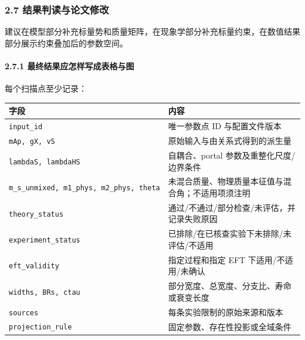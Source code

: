 \documentclass[
  chinese,
  UTF8]{ctexart}
\newcounter{none} %
\begin{document}
\subsubsection{2.7 结果判读与论文修改}\label{major-1-step-7}

建议在模型部分补充标量势和质量矩阵，在现象学部分补充标量约束，在数值结果部分展示约束叠加后的参数空间。

\paragraph{2.7.1
最终结果应怎样写成表格与图}\label{ux6700ux7ec8ux7ed3ux679cux5e94ux600eux6837ux5199ux6210ux8868ux683cux4e0eux56fe}

每个扫描点至少记录：

{\def\LTcaptype{none} %
\begin{longtable}[]{@{}
  >{\raggedright\arraybackslash}p{}
  >{\raggedright\arraybackslash}p{}@{}}
\toprule\noalign{}
\begin{minipage}[b]{\linewidth}\raggedright
字段
\end{minipage} & \begin{minipage}[b]{\linewidth}\raggedright
内容
\end{minipage} \\
\midrule\noalign{}
\endhead
\bottomrule\noalign{}
\endlastfoot
\texttt{input\_id} & 唯一参数点 ID 与配置文件版本 \\
\texttt{mAp,\ gX,\ vS} & 原始输入与由关系式得到的派生量 \\
\texttt{lambdaS,\ lambdaHS} & 自耦合、portal
参数及重整化尺度/边界条件 \\
\texttt{m\_s\_unmixed,\ m1\_phys,\ m2\_phys,\ theta} &
未混合质量、物理质量本征值与混合角；不适用项须注明 \\
\texttt{theory\_status} & 通过/不通过/部分检查/未评估，并记录失败原因 \\
\texttt{experiment\_status} &
已排除/在已核查实验下未排除/未评估/不适用 \\
\texttt{eft\_validity} & 指定过程和指定 EFT 下适用/不适用/未确认 \\
\texttt{widths,\ BRs,\ ctau} &
部分宽度、总宽度、分支比、寿命或衰变长度 \\
\texttt{sources} & 每条实验限制的原始来源和版本 \\
\texttt{projection\_rule} & 固定参数、存在性投影或全域条件 \\
\end{longtable}
}
\end{document}
